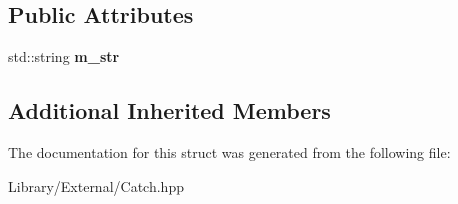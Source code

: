 \subsection*{Public Attributes}
\begin{DoxyCompactItemize}
\item 
\hypertarget{struct_catch_1_1_matchers_1_1_impl_1_1_std_string_1_1_equals_a41fc4413185f47d8b6d8da7a55078921}{}std\+::string {\bfseries m\+\_\+str}\label{struct_catch_1_1_matchers_1_1_impl_1_1_std_string_1_1_equals_a41fc4413185f47d8b6d8da7a55078921}

\end{DoxyCompactItemize}
\subsection*{Additional Inherited Members}


The documentation for this struct was generated from the following file\+:\begin{DoxyCompactItemize}
\item 
Library/\+External/Catch.\+hpp\end{DoxyCompactItemize}
